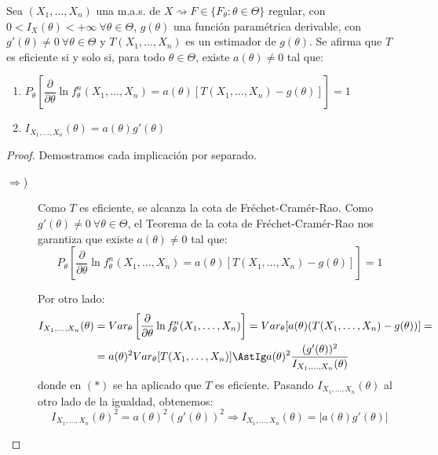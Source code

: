 \begin{teo}
    Sea $(X_1, \ldots, X_n)$ una m.a.s. de $X \rightsquigarrow F \in \{F_\theta : \theta \in \Theta\}$ regular, con $0 < I_X(\theta) < +\infty\ \forall \theta \in \Theta$, $g(\theta)$ una función paramétrica derivable, con $g'(\theta) \neq 0\ \forall \theta \in \Theta$ y $T(X_1, \ldots, X_n)$ es un estimador de $g(\theta)$. Se afirma que $T$ es eficiente si y solo si, para todo $\theta \in \Theta$, existe $a(\theta) \neq 0$ tal que:
    \begin{enumerate}
        \item $P_\theta\left[\dfrac{\partial}{\partial\theta}\ln f^n_\theta(X_1,\ldots,X_n)=a(\theta)[T(X_1,\ldots,X_n)-g(\theta)]\right]=1$
        \item $I_{X_1,\ldots,X_n}(\theta)=a(\theta)g'(\theta)$
    \end{enumerate}
    \begin{proof}
        Demostramos cada implicación por separado.
        \begin{description}
            \item[$\Longrightarrow$)] Como $T$ es eficiente, se alcanza la cota de Fréchet-Cramér-Rao. Como $g'(\theta) \neq 0\ \forall \theta \in \Theta$, el Teorema de la cota de Fréchet-Cramér-Rao nos garantiza que existe $a(\theta) \neq 0$ tal que:
            \begin{equation*}
                P_\theta\left[\dfrac{\partial}{\partial\theta}\ln f^n_\theta(X_1,\ldots,X_n)=a(\theta)[T(X_1,\ldots,X_n)-g(\theta)]\right]=1
            \end{equation*}
            
            Por otro lado:
            \begin{align*}
                I_{X_1,\ldots,X_n}(\theta) &= Var_\theta\left[\dfrac{\partial}{\partial\theta}\ln f^n_\theta(X_1,\ldots,X_n)\right] = Var_\theta[a(\theta)(T(X_1,\ldots,X_n)-g(\theta))] =\\&= a(\theta)^2 Var_\theta[T(X_1,\ldots,X_n)] \AstIg a(\theta)^2 \dfrac{(g'(\theta))^2}{I_{X_1,\ldots,X_n}(\theta)}
            \end{align*}
            donde en $(\ast)$ se ha aplicado que $T$ es eficiente. Pasando $I_{X_1,\ldots,X_n}(\theta)$ al otro lado de la igualdad, obtenemos:
            \begin{equation*}
                I_{X_1,\ldots,X_n}(\theta)^2 = a(\theta)^2 (g'(\theta))^2 \Longrightarrow I_{X_1,\ldots,X_n}(\theta) = |a(\theta) g'(\theta)|
            \end{equation*}


\end{description}
\end{proof}
\end{teo}
